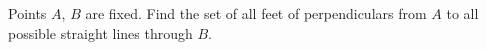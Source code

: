 Points $A$, $B$ are fixed. Find the set of all feet of perpendiculars from $A$ to all possible straight lines through $B$.
